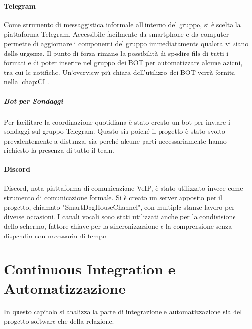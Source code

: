     \paragraph{Telegram}
    Come strumento di messaggistica informale all'interno del gruppo, si è scelta la piattaforma Telegram. Accessibile facilmente da smartphone e da computer permette di aggiornare i componenti del gruppo immediatamente qualora vi siano delle urgenze. Il punto di forza rimane la  possibilità di spedire file di tutti i formati e di poter inserire nel gruppo dei BOT per automatizzare alcune azioni, tra cui le notifiche. Un'overview più chiara dell'utilizzo dei BOT verrà fornita nella \autoref{chap:CI}.
    \subparagraph{Bot per Sondaggi} Per facilitare la coordinazione quotidiana è stato creato un bot per inviare i sondaggi sul gruppo Telegram. Questo sia poiché il progetto è stato svolto prevalentemente a distanza, sia perché alcune parti necessariamente hanno richiesto la presenza di tutto il team. 
    
    \paragraph{Discord}
    Discord, nota piattaforma di comunicazione VoIP, è stato utilizzato invece come strumento di comunicazione formale. Si è creato un server apposito per il progetto, chiamato "SmartDogHouseChannel", con multiple stanze lavoro per diverse occasioni.
    I canali vocali sono stati utilizzati anche per la condivisione dello schermo, fattore chiave per la sincronizzazione e la comprensione senza dispendio non necessario di tempo. 

\section{Continuous Integration e Automatizzazione}
\label{chap:CI}
In questo capitolo si analizza la parte di integrazione e automatizzazione sia del progetto software che della relazione. 
